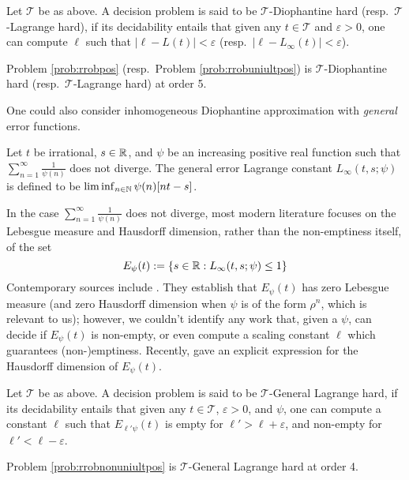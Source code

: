\begin{definition}
\label{def:hardness}
Let $\mathcal{T}$ be as above. A decision problem is said to be $\mathcal{T}$-Diophantine hard (resp.\ $\mathcal{T}$-Lagrange hard), if its decidability entails that given any $t \in \mathcal{T}$ and $\varepsilon > 0$, one can compute $\ell$ such that $|\ell - L(t)| < \varepsilon$ (resp.\  $|\ell - L_\infty(t)| < \varepsilon$).
\end{definition}

\begin{theorem}
\label{thm:hardness}
Problem \ref{prob:rrobpos} (resp.\ Problem \ref{prob:rrobuniultpos}) is $\mathcal{T}$-Diophantine hard (resp.\ $\mathcal{T}$-Lagrange hard) at order 5. 
\end{theorem}

One could also consider inhomogeneous Diophantine approximation with \textit{general} error functions.
\begin{definition}
\label{def:generallagrange}
Let $t$ be irrational, $s\in \mathbb{R}$, and $\psi$ be an increasing positive real function such that $\sum_{n=1}^\infty \frac{1}{\psi(n)}$ does not diverge. The general error Lagrange constant $L_\infty(t, s; \psi)$ is defined to be $\liminf_{n\in \mathbb{N}}\psi(n)[nt - s]$.
\end{definition}

In the case $\sum_{n=1}^\infty \frac{1}{\psi(n)}$ does not diverge, most modern literature focuses on the Lebesgue measure and Hausdorff dimension, rather than the non-emptiness itself, of the set 
$$
E_\psi(t) := \{s\in \mathbb{R}: L_\infty(t, s; \psi) \le 1\}
$$ 
Contemporary sources include \cite{generaldio1,generaldio2,generaldio3,generaldio4}. They establish that $E_\psi(t)$ has zero Lebesgue measure (and zero Hausdorff dimension when $\psi$ is of the form $\rho^n$, which is relevant to us); however, we couldn't identify any work that, given a $\psi$, can decide if $E_{\psi}(t)$ is non-empty, or even compute a scaling constant $\ell$ which guarantees (non-)emptiness. Recently, \cite{generaldio5} gave an explicit expression for the Hausdorff dimension of $E_\psi(t)$.

\begin{definition}
\label{def:hardness2}
Let $\mathcal{T}$ be as above. A decision problem is said to be $\mathcal{T}$-General Lagrange hard, if its decidability entails that given any $t \in \mathcal{T}$, $\varepsilon > 0$, and $\psi$, one can compute a constant $\ell$ such that $E_{\ell'\psi}(t)$ is empty for $\ell' > \ell + \varepsilon$, and non-empty for $\ell' < \ell - \varepsilon$.
\end{definition}

\begin{theorem}
\label{thm:hardness2}
Problem \ref{prob:rrobnonuniultpos} is $\mathcal{T}$-General Lagrange hard at order 4. 
\end{theorem}
